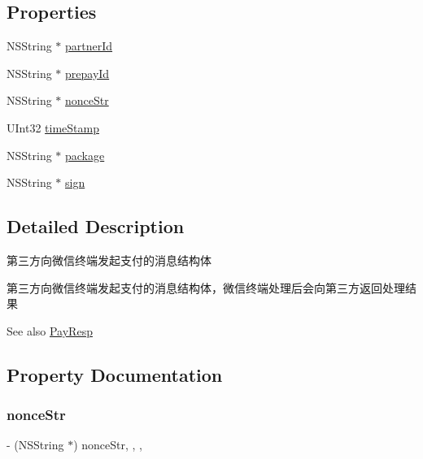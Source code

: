 \subsection*{Properties}
\begin{DoxyCompactItemize}
\item 
N\+S\+String $\ast$ \mbox{\hyperlink{interface_pay_req_a7b288698ae50e17aca7585a83c4e9e29}{partner\+Id}}
\item 
N\+S\+String $\ast$ \mbox{\hyperlink{interface_pay_req_a090c6ff420a9af25b9aa66369dbc76e9}{prepay\+Id}}
\item 
N\+S\+String $\ast$ \mbox{\hyperlink{interface_pay_req_a71444f8a5f95155655ed99a4a249197a}{nonce\+Str}}
\item 
U\+Int32 \mbox{\hyperlink{interface_pay_req_a86b06f5d10b430b4ca3f7628d12f137c}{time\+Stamp}}
\item 
N\+S\+String $\ast$ \mbox{\hyperlink{interface_pay_req_adbdf045c925816fefe99f872edf4cc9b}{package}}
\item 
N\+S\+String $\ast$ \mbox{\hyperlink{interface_pay_req_a9201e74cddd6b1df5d14624dc6678f45}{sign}}
\end{DoxyCompactItemize}


\subsection{Detailed Description}
第三方向微信终端发起支付的消息结构体 

第三方向微信终端发起支付的消息结构体，微信终端处理后会向第三方返回处理结果 \begin{DoxySeeAlso}{See also}
\mbox{\hyperlink{interface_pay_resp}{Pay\+Resp}} 
\end{DoxySeeAlso}


\subsection{Property Documentation}
\mbox{\label{interface_pay_req_a71444f8a5f95155655ed99a4a249197a}} 
\subsubsection{\texorpdfstring{nonce\+Str}{nonceStr}}
{\footnotesize\ttfamily -\/ (N\+S\+String $\ast$) nonce\+Str\hspace{0.3cm}{\ttfamily [read]}, {\ttfamily [write]}, {\ttfamily [nonatomic]}, {\ttfamily [retain]}}

